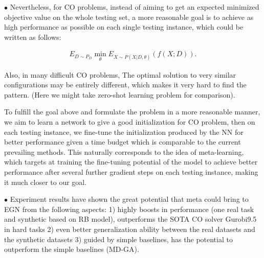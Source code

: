 $\bullet$ 
Nevertheless, for CO problems, instead of aiming to get an expected minimized objective value on the whole testing set, a more reasonable goal is to achieve as high performance as possible on each single testing instance, which could be written as follows: 

\begin{align*}
   E_{D\sim P_D}  \min_{\theta} E_{X\sim P(X|D,\theta)}(f(X;D)).
\end{align*}

Also, in many difficult CO problems, The optimal solution to very similar configurations may be entirely different, which makes it very hard to find the pattern.
(Here we might take zero-shot learning problem for comparison).

To fulfill the goal above and formulate the problem in a more reasonable manner, we aim to learn a network to give a good initialization for CO problem, then on each testing instance, we fine-tune the initialization produced by the NN for better performance given a time budget which is comparable to the current prevailing methods. This naturally corresponds to the idea of meta-learning, which targets at training the fine-tuning potential of the model to achieve better performance after several further gradient steps on each testing instance, making it much closer to our goal.



$\bullet$ Experiment results have shown the great potential that meta could bring to EGN from the following aspects: 1) highly boosts in performance (one real task and synthetic based on RB model), outperforms the SOTA CO solver Gurobi9.5 in hard tasks 2) even better generalization ability between the real datasets and the synthetic datasets 3) guided by simple baselines, has the potential to outperform the simple baselines (MD-GA).
\fi